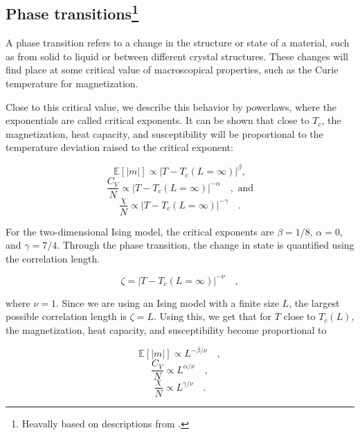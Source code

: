 \documentclass[../main_proj4_correct_template.tex]{subfiles}
\begin{document}
\subsection{Phase transitions\footnote{Heavally based on descriptions from \cite{prosjekttbeskrivelse4}.}}

A phase transition refers to a change in the structure or state of a material, such as from solid to liquid or between different crystal structures. These changes will find place at some critical value of macroscopical properties, such as the Curie temperature for magnetization.

Close to this critical value, we describe this behavior by powerlaws, where the exponentials are called critical exponents. It can be shown that close to $T_c$, the magnetization, heat capacity, and susceptibility will be proportional to the temperature deviation raised to the critical exponent:

\begin{equation}
    \mathbb{E}[|m|] \propto | T-T_c(L=\infty)|^{\beta}, 
\end{equation}
\begin{equation}
\label{eq:p4cv1}
    \frac{C_V}{N}\propto | T-T_c(L=\infty)|^{-\alpha} \quad , \text{ and}
\end{equation}
\begin{equation}
\label{eq:p4chi1}
    \frac{\chi}{N}\propto | T-T_c(L=\infty)|^{-\gamma} \quad.
\end{equation}

For the two-dimensional Ising model, the critical exponents are $\beta=1/8$, $\alpha=0$, and $\gamma = 7/4$. Through the phase transition, the change in state is quantified using the correlation length.

\begin{equation}
    \label{eq:p4_correlation_len}
    \zeta = |T - T_c(L=\infty)|^{-\nu} \quad, 
\end{equation}

where $\nu=1$. Since we are using an Ising model with a finite size $L$, the largest possible correlation length is $\zeta=L$. Using this, we get that for $T$ close to $T_c(L)$, the magnetization, heat capacity, and susceptibility become proportional to

\begin{equation}
    \mathbb{E}[|m|] \propto L^{-\beta/\nu}\quad , 
\end{equation}
\begin{equation}
\label{eq:p4cv2}
    \frac{C_V}{N}\propto L^{\alpha/\nu} \quad, 
\end{equation}
\begin{equation}
\label{eq:p4chi2}
    \frac{\chi}{N}\propto L^{\gamma/\nu} \quad.
\end{equation}
\end{document}
